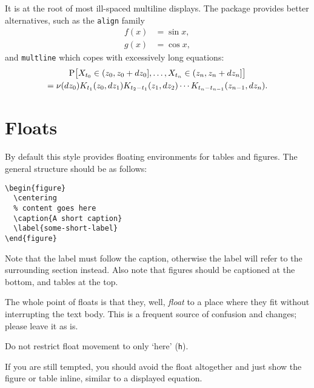 It is at the root of most ill-spaced multiline displays.  The
 package provides better alternatives, such as the
\lstinline-align- family
\begin{align*}
  f(x) &= \sin x, \\
  g(x) &= \cos x,
\end{align*}
and \lstinline-multline- which copes with excessively long equations:
\begin{multline*}
  \def\P{\mathrm P}
  \P\bigl[X_{t_0} \in (z_0, z_0+dz_0],\ldots, X_{t_n}\in(z_n,z_n+dz_n]\bigr]
  \\= \nu(dz_0) K_{t_1}(z_0,dz_1) K_{t_2-t_1}(z_1,dz_2)\cdots
  K_{t_n-t_{n-1}}(z_{n-1},dz_n).
\end{multline*}

\section{Floats}

By default this style provides floating environments for tables and
figures.  The general structure should be as follows:
\begin{lstlisting}
\begin{figure}
  \centering
  % content goes here
  \caption{A short caption}
  \label{some-short-label}
\end{figure}
\end{lstlisting}
Note that the label must follow the caption, otherwise the label will
refer to the surrounding section instead.  Also note that figures
should be captioned at the bottom, and tables at the top.

The whole point of floats is that they, well, \emph{float} to a place
where they fit without interrupting the text body.  This is a frequent
source of confusion and changes; please leave it as is.

\begin{Rule}
  Do not restrict float movement to only `here'
  \textnormal{(\lstinline-h-)}.
\end{Rule}

If you are still tempted, you should avoid the float altogether and
just show the figure or table inline, similar to a displayed equation.

